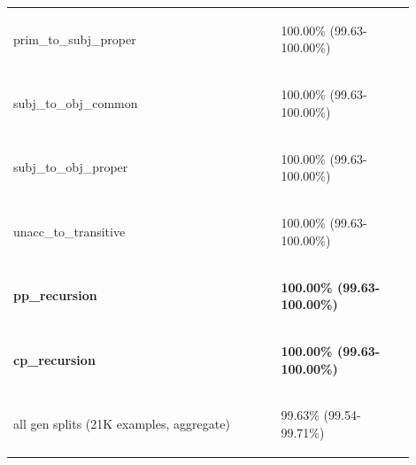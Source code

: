 \documentclass[11pt]{article}
\begin{document}
\begin{table}
\begin{tabular}{p{0.6\linewidth} p{0.3\linewidth}}
\begin{tiny}prim\_to\_subj\_proper\end{tiny} & \begin{tiny} 100.00\% (99.63-100.00\%)\end{tiny} \\
\begin{tiny}subj\_to\_obj\_common\end{tiny} & \begin{tiny} 100.00\% (99.63-100.00\%)\end{tiny} \\
\begin{tiny}subj\_to\_obj\_proper\end{tiny} & \begin{tiny} 100.00\% (99.63-100.00\%)\end{tiny} \\
\begin{tiny}unacc\_to\_transitive\end{tiny} & \begin{tiny} 100.00\% (99.63-100.00\%)\end{tiny} \\
\begin{tiny}\textbf{pp\_recursion}\end{tiny} & \begin{tiny} \textbf{100.00\% (99.63-100.00\%)}\end{tiny} \\
\begin{tiny}\textbf{cp\_recursion}\end{tiny} & \begin{tiny} \textbf{100.00\% (99.63-100.00\%)}\end{tiny} \\
\hline
\begin{tiny}all gen splits (21K examples, aggregate)\end{tiny} & \begin{tiny}99.63\% (99.54-99.71\%)\end{tiny} \\
\hline
\end{tabular}

\end{table}
\end{document}
